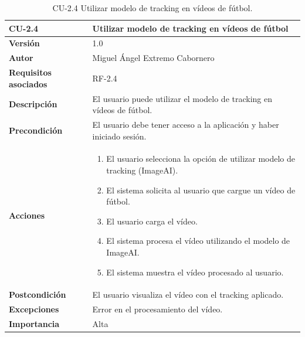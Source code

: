 \begin{table}[p]
    \centering
    \begin{tabularx}{\linewidth}{ p{} p{} }
        \toprule
        \textbf{CU-2.4}    & \textbf{Utilizar modelo de tracking en vídeos de fútbol}\\
        \toprule
        \textbf{Versión}              & 1.0    \\
        \textbf{Autor}                & Miguel Ángel Extremo Cabornero \\
        \textbf{Requisitos asociados} & RF-2.4 \\
        \textbf{Descripción}          & El usuario puede utilizar el modelo de tracking en vídeos de fútbol. \\
        \textbf{Precondición}         & El usuario debe tener acceso a la aplicación y haber iniciado sesión. \\
        \textbf{Acciones}             &
        \begin{enumerate}
            \item El usuario selecciona la opción de utilizar modelo de tracking (ImageAI).
            \item El sistema solicita al usuario que cargue un vídeo de fútbol.
            \item El usuario carga el vídeo.
            \item El sistema procesa el vídeo utilizando el modelo de ImageAI.
            \item El sistema muestra el vídeo procesado al usuario.
        \end{enumerate}\\
        \textbf{Postcondición}        & El usuario visualiza el vídeo con el tracking aplicado. \\
        \textbf{Excepciones}          & Error en el procesamiento del vídeo. \\
        \textbf{Importancia}          & Alta \\
        \bottomrule
    \end{tabularx}
    \caption{CU-2.4 Utilizar modelo de tracking en vídeos de fútbol.}
\end{table}


